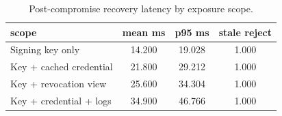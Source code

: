 \begin{table}[htbp]
\centering
\caption{Post-compromise recovery latency by exposure scope.}
\label{tab:recovery}
\begin{tabular}{@{}lccc@{}}
\toprule
scope & mean ms & p95 ms & stale reject \\
\midrule
Signing key only & 14.200 & 19.028 & 1.000 \\
Key + cached credential & 21.800 & 29.212 & 1.000 \\
Key + revocation view & 25.600 & 34.304 & 1.000 \\
Key + credential + logs & 34.900 & 46.766 & 1.000 \\
\bottomrule
\end{tabular}
\end{table}
